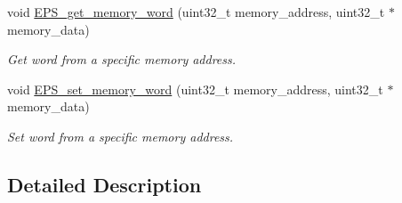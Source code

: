 \begin{DoxyCompactItemize}
\item 
void \hyperlink{group__eps__non__volatile__mem__handling_ga5cb54706a7641065e63b769c89caeffc}{E\-P\-S\-\_\-get\-\_\-memory\-\_\-word} (uint32\-\_\-t memory\-\_\-address, uint32\-\_\-t $\ast$memory\-\_\-data)
\begin{DoxyCompactList}\small\item\em Get word from a specific memory address. \end{DoxyCompactList}\item 
void \hyperlink{group__eps__non__volatile__mem__handling_ga1357fef7326e7d2c99cd313493aefe03}{E\-P\-S\-\_\-set\-\_\-memory\-\_\-word} (uint32\-\_\-t memory\-\_\-address, uint32\-\_\-t $\ast$memory\-\_\-data)
\begin{DoxyCompactList}\small\item\em Set word from a specific memory address. \end{DoxyCompactList}\end{DoxyCompactItemize}


\subsection{Detailed Description}


